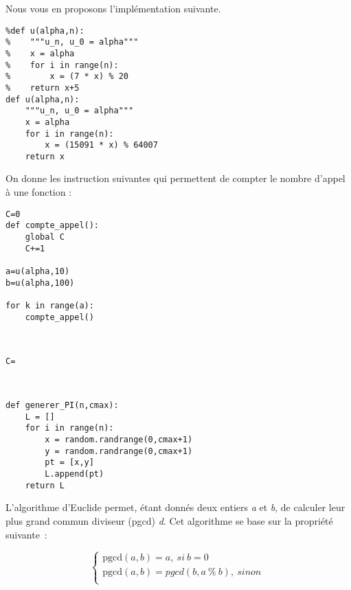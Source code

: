 \ifprof
\else
Nous vous en proposons l'implémentation suivante. 
\begin{lstlisting}
%def u(alpha,n):
%    """u_n, u_0 = alpha"""
%    x = alpha
%    for i in range(n):
%        x = (7 * x) % 20
%    return x+5
def u(alpha,n):
    """u_n, u_0 = alpha"""
    x = alpha
    for i in range(n):
        x = (15091 * x) % 64007
    return x
\end{lstlisting}


On donne les instruction suivantes qui permettent de compter le nombre d'appel à une fonction : 


\begin{lstlisting}
C=0
def compte_appel():
    global C
    C+=1

a=u(alpha,10)
b=u(alpha,100)

for k in range(a):
    compte_appel()
\end{lstlisting}
\fi


\ifprof
\begin{corrige}~\\ \vspace{-.7cm}
\begin{lstlisting}
C=
\end{lstlisting}
\end{corrige}
\else
\fi


\ifprof
\begin{corrige}~\\ \vspace{-.7cm}
\begin{lstlisting}
def generer_PI(n,cmax):
    L = []
    for i in range(n):
        x = random.randrange(0,cmax+1)
        y = random.randrange(0,cmax+1)
        pt = [x,y]
        L.append(pt)
    return L
\end{lstlisting}
\end{corrige}
\else
\fi

\ifprof
\else
L'algorithme d'Euclide permet, étant donnés deux entiers \emph{a} et
\emph{b}, de calculer leur plus grand commun diviseur (pgcd) \emph{d}.
Cet algorithme se base sur la propriété suivante~:

\[\left\{ \begin{matrix}
\text{pgcd}\left( a,b \right) = a,\ si\ b = 0 \\
\text{pgcd}\left( a,b \right) = pgcd\left( b,a\ \%\ b \right),\ sinon \\
\end{matrix} \right.\ \]

